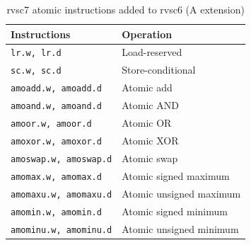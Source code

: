 \begin{table}[htb]
\centering
\caption{rvsc7 atomic instructions added to rvsc6 (A extension)}
\label{tab:rvsc7-isa}
\begin{tabular}{ll}
\toprule
\textbf{Instructions} & \textbf{Operation} \\
\midrule
\texttt{lr.w, lr.d}           & Load-reserved \\
\texttt{sc.w, sc.d}           & Store-conditional \\
\texttt{amoadd.w, amoadd.d}   & Atomic add \\
\texttt{amoand.w, amoand.d}   & Atomic AND \\
\texttt{amoor.w, amoor.d}     & Atomic OR \\
\texttt{amoxor.w, amoxor.d}   & Atomic XOR \\
\texttt{amoswap.w, amoswap.d} & Atomic swap \\
\texttt{amomax.w, amomax.d}   & Atomic signed maximum \\
\texttt{amomaxu.w, amomaxu.d} & Atomic unsigned maximum \\
\texttt{amomin.w, amomin.d}   & Atomic signed minimum \\
\texttt{amominu.w, amominu.d} & Atomic unsigned minimum \\
\bottomrule
\end{tabular}
\end{table}
